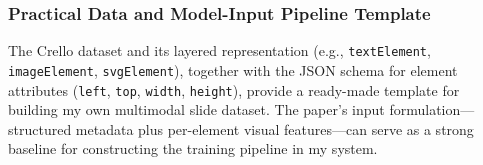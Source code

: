\documentclass{article}
\begin{document}
\subsubsection{Practical Data and Model-Input Pipeline Template}
The Crello dataset and its layered representation (e.g., \texttt{textElement}, \texttt{imageElement}, \texttt{svgElement}), together with the JSON schema for element attributes (\texttt{left}, \texttt{top}, \texttt{width}, \texttt{height}), provide a ready-made template for building my own multimodal slide dataset. The paper's input formulation—structured metadata plus per-element visual features—can serve as a strong baseline for constructing the training pipeline in my system.
\end{document}
